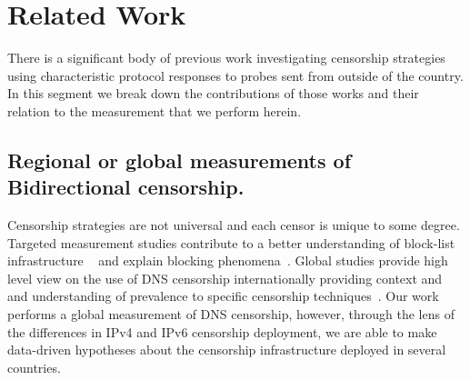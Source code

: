 \section{Related Work}\label{sec:related}

There is a significant body of previous work investigating censorship
strategies using characteristic protocol responses to probes sent from outside
of the country. In this segment we break down the contributions of those works
and their relation to the measurement that we perform herein.

\subsection{Regional or global measurements of Bidirectional censorship.}

Censorship strategies are not universal and each censor is unique to some
degree. Targeted measurement studies contribute to a better understanding of
block-list infrastructure ~\cite{ramesh2020decentralized, USESEC21:GFWatch} and
explain blocking phenomena~\cite{global2002great,
Anonymous2020:TripletCensors}. Global studies provide high level view on the
use of DNS censorship internationally providing context and and understanding
of prevalence to specific censorship techniques~\cite{vandersloot2018quack,
scott2016satellite, pearce2017global, sundara2020censored, niaki2020iclab}.
Our work performs a global measurement of DNS censorship, however, through the
lens of the differences in IPv4 and IPv6 censorship deployment, we are able to
make data-driven hypotheses about the censorship infrastructure deployed in
several countries.






